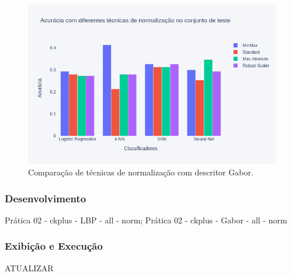 \begin{figure}[!htbp]
	\centering
	\includegraphics[width=1.0\linewidth,clip=true,trim=0cm 0cm 0cm 0cm, keepaspectratio=true]{bar_norm_all_gabor.png}
	\caption{Comparação de técnicas de normalização com descritor Gabor.}
	\label{fig:bar_norm_all_gabor}
\end{figure}

\subsubsection{Desenvolvimento} Prática 02 - ckplus  - LBP - all - norm; Prática 02 - ckplus  - Gabor - all - norm
\subsubsection{Exibição e Execução} ATUALIZAR
